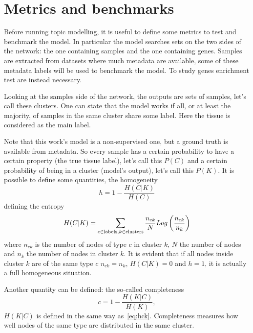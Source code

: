\section{Metrics and benchmarks}
Before running topic modelling, it is useful to define some metrics to test and benchmark the model. In particular the model searches sets on the two sides of the network: the one containing samples and the one containing genes. Samples are extracted from datasets where much metadata are available, some of these metadata labels will be used to benchmark the model. To study genes enrichment test are instead necessary.

Looking at the samples side of the network, the outputs are sets of samples, let's call these clusters. One can state that the model works if all, or at least the majority, of samples in the same cluster share some label. Here the tissue is considered as the main label.

Note that this work's model is a non-supervised one, but a ground truth is available from metadata. So every sample has a certain probability to have a certain property (the true tissue label), let's call this $P(C)$ and a certain probability of being in a cluster (model's output), let's call this $P(K)$.
It is possible to define some quantities, the homogeneity
\begin{equation}\label{eq:homogeneity}
    h=1-\frac{H(C|K)}{H(C)}
\end{equation}
defining the entropy
\begin{equation}\label{eq:hck}
    H(C|K)=\sum_{c\in \mathrm{labels},\\ k \in \mathrm{clusters}}\frac{n_{c k}}{N}Log\left(\frac{n_{c k}}{n_k}\right)
\end{equation}
where $n_{c k}$ is the number of nodes of type $c$ in cluster $k$, $N$ the number of nodes and $n_k$ the number of nodes in cluster $k$. It is evident that if all nodes inside cluster $k$ are of the same type $c$ $n_{c k}=n_{k}$, $H(C|K)=0$ and $h=1$, it is actually a full homogeneous situation.

Another quantity can be defined: the so-called completeness
\begin{equation}\label{eq:completness}
    c=1-\frac{H(K|C)}{H(K)},
\end{equation}
$H(K|C)$ is defined in the same way as~\ref{eq:hck}. Completeness measures how well nodes of the same type are distributed in the same cluster.

